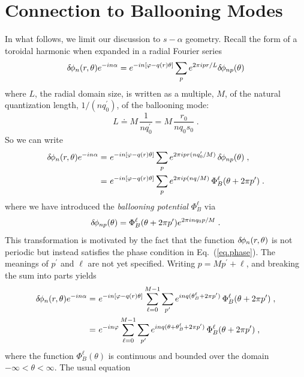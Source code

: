 \section{Connection to Ballooning Modes}

In what follows, we limit our discussion to $s-\alpha$ geometry. 
Recall the form of a toroidal harmonic when expanded in a 
radial Fourier series 
%
\begin{equation}
\delta \hskip -1pt \phi_n(r,\theta) e^{-in\alpha} = 
e^{-in\left[\varphi - q(r)\theta\right]} \sum_p e^{2\pi i p r/L}
\delta \hskip -1pt \phi_{np}(\theta) 
\end{equation}
%
where $L$, the radial domain size, is written as a multiple, 
$M$, of the natural quantization length, $1/(nq^\prime_0)$, of the 
ballooning mode:
%
\begin{equation}
L \doteq M \, \frac{1}{n q^\prime_0} = M \, \frac{r_0}{n q_0 s_0} \; .
\end{equation}
%
So we can write
%
\begin{align}
\delta \hskip -1pt \phi_n(r,\theta) e^{-in\alpha} = &~
e^{-in\left[\varphi - q(r)\theta\right]} \sum_p e^{2\pi i p r (n q^\prime_0/M)}
\, \delta \hskip -1pt \phi_{np}(\theta) \; , \\
= &~e^{-in\left[\varphi - q(r)\theta\right]} \sum_p e^{2\pi i p (n q/M)}
\, \Phi_B^{\ell}(\theta+2\pi p^\prime) \; .
\end{align}
%
where we have introduced the {\it ballooning potential} $\Phi_B^{\ell}$ 
via
%
\begin{equation}
\delta \hskip -1pt \phi_{np}(\theta) = \Phi_B^{\ell}(\theta+2\pi p^\prime) e^{2\pi i n 
q_0 p/M} \; .
\end{equation}
%
This transformation is motivated by the fact that the function 
$\delta \hskip -1pt \phi_n(r,\theta)$ is not periodic but instead satisfies the 
phase condition in Eq.~(\ref{eq.phase}).  The meanings of $p^\prime$ 
and $\ell$ are not yet specified.  Writing $p = M p^\prime + \ell$, 
and breaking the sum into parts yields 
%
\begin{align}
\delta \hskip -1pt \phi_n(r,\theta) e^{-in\alpha} = &~
e^{-in\left[\varphi - q(r)\theta\right]} \sum_{\ell=0}^{M-1} 
\sum_{p^\prime} e^{i n q (\theta_B^\ell + 2\pi p^\prime)} 
\, \Phi_B^\ell(\theta+2\pi p^\prime) \; , \\
= &~
e^{-in\varphi} \sum_{\ell=0}^{M-1} 
\sum_{p^\prime} e^{i n q (\theta+\theta_B^\ell + 2\pi p^\prime)} 
\, \Phi_B^\ell(\theta+2\pi p^\prime) \; , \label{eq.balloonphi}
\end{align} 
%
where the function $\Phi_B^\ell(\theta)$ is continuous and bounded 
over the domain $-\infty < \theta < \infty$.  The usual equation 
